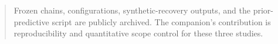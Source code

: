 \documentclass[aps,prd,twocolumn,superscriptaddress,showpacs,preprintnumbers,nofootinbib,longbibliography,floatfix]{revtex4-2}
\newcommand{\Neff}{N_{\rm eff}}
\begin{document}
\begin{abstract}
Frozen chains, configurations, synthetic-recovery outputs, and the
prior-predictive script are publicly archived.  The companion's contribution
is reproducibility and quantitative scope control for these three studies.
\end{abstract}

\end{document}
